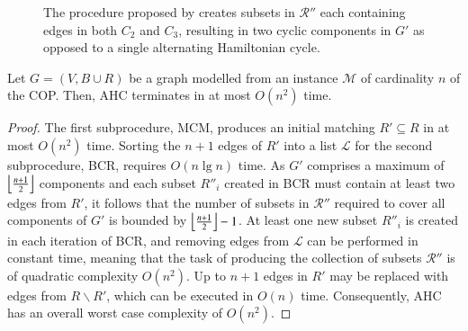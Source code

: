 \documentclass[a4paper,11pt,authoryear]{elsarticle}
\begin{document}
\begin{figure}[h!]
	\centering	
	\begin{subfigure}[h]{0.35\textwidth}
		
		\caption{}
		\label{fig:bcrerror}
	\end{subfigure} \hspace{5mm}
	\begin{subfigure}[h]{0.25\textwidth}
		
		\caption{}
		\label{fig:mpsconnecterror}
	\end{subfigure} \hspace{5mm}
	\begin{subfigure}[h]{0.25\textwidth}
		
		\caption{}
		\label{fig:mpscycleerror}
	\end{subfigure}
	\caption{The procedure proposed by \cite{becker2010} creates subsets in $\mathcal{R}''$ each containing edges in both $C_2$ and $C_3$, resulting in two cyclic components in $G'$ as opposed to a single alternating Hamiltonian cycle.}	
	\label{fig:overlaperror}
\end{figure}

\begin{theorem}
	Let $G=(V, B \cup R)$ be a graph modelled from an instance $\mathcal{M}$ of cardinality $n$ of the COP. Then, AHC terminates in at most $O(n^2)$ time.
	\label{thm:ahc}
\end{theorem}

\begin{proof}
	The first subprocedure, MCM, produces an initial matching $R' \subseteq R$ in at most $O(n^2)$ time. Sorting the $n+1$ edges of $R'$ into a list $\mathcal{L}$ for the second subprocedure, BCR, requires $O(n\lg n)$ time. As $G'$ comprises a maximum of $\floor*{\frac{n+1}{2}}$ components and each subset $R''_i$ created in BCR must contain at least two edges from $R'$, it follows that the number of subsets in $\mathcal{R}''$ required to cover all components of $G'$ is bounded by $\floor*{\frac{n+1}{2}}-1$. At least one new subset $R''_i$ is created in each iteration of BCR, and removing edges from $\mathcal{L}$ can be performed in constant time, meaning that the task of producing the collection of subsets $\mathcal{R}''$ is of quadratic complexity $O(n^2)$. Up to $n+1$ edges in $R'$ may be replaced with edges from $R \backslash R'$, which can be executed in $O(n)$ time. Consequently, AHC has an overall worst case complexity of $O(n^2)$. 
\end{proof}	
\end{document}
